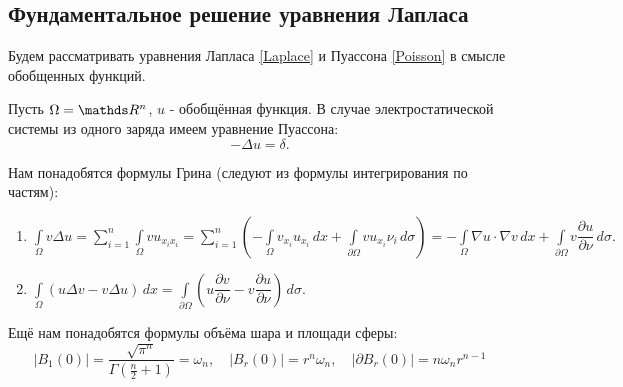\subsection{Фундаментальное решение уравнения Лапласа}
Будем рассматривать уравнения Лапласа \eqref{Laplace} и Пуассона \eqref{Poisson} в смысле обобщенных функций.

Пусть $\Omega = \real^n$, $u$ - обобщённая функция. В случае электростатической системы из одного заряда имеем уравнение Пуассона:
\begin{equation}
	-\Delta u = \delta.
\label{comLaplace}
\end{equation}

Нам понадобятся формулы Грина (следуют из формулы интегрирования по частям):
\begin{enumerate}
\item $\displaystyle \int \limits_\Omega v \Delta u = \sum \limits_{i = 1}^{n} \int \limits_\Omega v u_{x_i x_i} = \sum \limits_{i = 1}^{n} \left( - \int \limits_\Omega v_{x_i} u_{x_i} \, dx + \int \limits_{\partial \Omega} v u_{x_i} \nu_i \, d\sigma \right) = - \int \limits_\Omega \nabla u \cdot \nabla v \, dx + \int \limits_{\partial \Omega} v \dfrac{\partial u}{\partial \nu} \, d\sigma.$
\item $\displaystyle \int \limits_{\Omega} \left( u \Delta v - v \Delta u \right) \, dx = \int \limits_{\partial \Omega} \left( u \dfrac{\partial v}{\partial \nu} - v \dfrac{\partial u}{\partial \nu} \right) \, d\sigma.$
\end{enumerate}
Ещё нам понадобятся формулы объёма шара и площади сферы:
$$ |B_1(0)| = \frac{\sqrt{\pi^n}}{\Gamma(\frac {n} {2} + 1)} = \omega_n, \quad  |B_r(0)| = r^n \omega_n, \quad | \partial B_r(0) | = n \omega_n r^{n-1}$$

